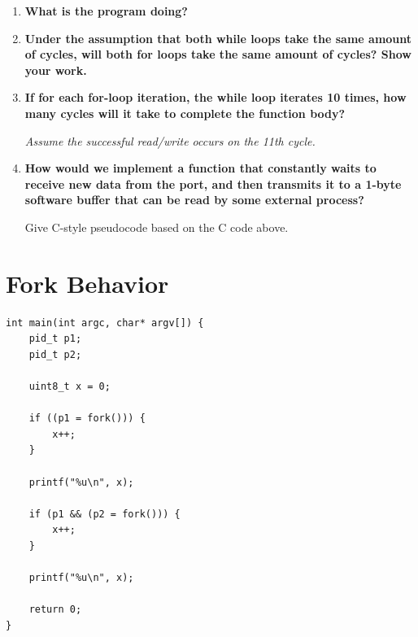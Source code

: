 \documentclass[14pt, a4paper]{article}
\begin{document}
\begin{enumerate}
    \item \textbf{What is the program doing?}

    \vspace{15mm}

    \item \textbf{Under the assumption that both while loops take the same
    amount of cycles, will both for loops take the same amount of cycles?
    Show your work.}

    \vspace{25mm}

    \item \textbf{If for each for-loop iteration, the while loop iterates
    10 times, how many cycles will it take to complete the function body?}

    \begin{center}
        \textit{Assume the successful read/write occurs on the 11th cycle.}
    \end{center}

    \vspace{30mm}

    \item \textbf{How would we implement a function that constantly waits
    to receive new data from the port, and then transmits it to a 1-byte
    software buffer that can be read by some external process?}

    Give C-style pseudocode based on the C code above.

    \vspace{35mm}
\end{enumerate}

\newpage

\section{Fork Behavior}

\begin{lstlisting}[style=cstyle]
int main(int argc, char* argv[]) {
    pid_t p1;
    pid_t p2;

    uint8_t x = 0;

    if ((p1 = fork())) {
        x++;
    }

    printf("%u\n", x);

    if (p1 && (p2 = fork())) {
        x++;
    }

    printf("%u\n", x);

    return 0;
}
\end{lstlisting}
\end{document}
